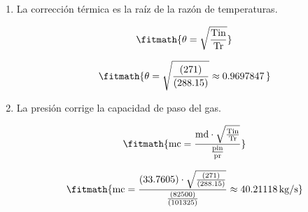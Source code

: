 \begin{enumerate}

\item La corrección térmica es la raíz de la razón de temperaturas.

\[\fitmath{\theta=\sqrt{\frac{\mathrm{Tin}}{\mathrm{Tr}}}}\]

\[\fitmath{\theta=\sqrt{\frac{(271)}{(288.15)}}\approx 0.9697847\,}\]

\item La presión corrige la capacidad de paso del gas.

\[\fitmath{\mathrm{mc}=\frac{\mathrm{md}\cdot \sqrt{\frac{\mathrm{Tin}}{\mathrm{Tr}}}}{\frac{\mathrm{pin}}{\mathrm{pr}}}}\]

\[\fitmath{\mathrm{mc}=\frac{(33.7605)\cdot \sqrt{\frac{(271)}{(288.15)}}}{\frac{(82500)}{(101325)}}\approx 40.21118\,\mathrm{kg/s}}\]

\end{enumerate}

